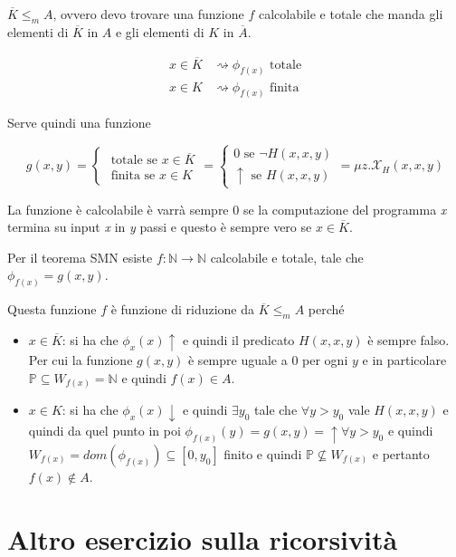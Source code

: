 $\overline{K} \leq_m A$, ovvero devo trovare una funzione $f$ calcolabile e totale che manda gli elementi di $\overline{K}$ in $A$ e gli elementi di $K$ in $\overline{A}$.

\begin{align*}
x \in \overline{K} &\rightsquigarrow \phi_{f(x)} \text{ totale} \\
x \in K &\rightsquigarrow \phi_{f(x)} \text{ finita}
\end{align*}

Serve quindi una funzione 

$$
g(x,y) = \begin{cases}
\text{ totale se } x \in \overline{K} \\
\text{ finita se } x \in K
\end{cases} = \begin{cases}
0 \text{ se } \neg H(x,x,y) \\
\uparrow \text{ se } H(x,x,y)
\end{cases} = \mu z . \mathcal{X}_H(x,x,y)
$$

La funzione è calcolabile è varrà sempre 0 se la computazione del programma \textit{x} termina su input \textit{x} in \textit{y} passi e questo è sempre vero se $x \in \overline{K}$.

Per il teorema SMN esiste $f : \mathbb{N} \rightarrow \mathbb{N}$ calcolabile e totale, tale che $\phi_{f(x)} = g(x,y)$.

Questa funzione $f$ è funzione di riduzione da $\overline{K} \leq_m A$ perché

\begin{itemize}
	\item $x \in \overline{K}$: si ha che $\phi_x(x) \uparrow$ e quindi il predicato $H(x,x,y)$ è sempre falso. Per cui la funzione $g(x,y)$ è sempre uguale a 0 per ogni $y$ e in particolare $\mathbb{P} \subseteq W_{f(x)} = \mathbb{N}$ e quindi $f(x) \in A$. 
	\item $x \in K$: si ha che $\phi_x(x)\downarrow$ e quindi $\exists y_0$ tale che $\forall y > y_0$ vale $H(x,x,y)$ e quindi da quel punto in poi $\phi_{f(x)}(y) = g(x,y) = \uparrow \forall y > y_0$ e quindi $W_{f(x)} = dom(\phi_{f(x)}) \subseteq [0, y_0]$ finito e quindi $\mathbb{P} \nsubseteq W_{f(x)}$ e pertanto $f(x) \notin A$.
\end{itemize}


\section{Altro esercizio sulla ricorsività}

